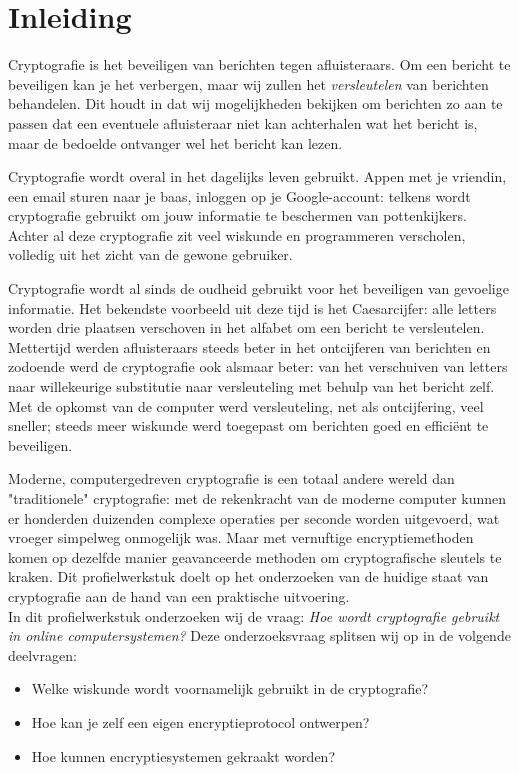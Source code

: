 \documentclass{report} %
\begin{document}
\chapter{Inleiding}
Cryptografie is het beveiligen van berichten tegen afluisteraars. Om een bericht te beveiligen kan je het verbergen, maar wij zullen het \textit{versleutelen} van berichten behandelen. Dit houdt in dat wij mogelijkheden bekijken om berichten zo aan te passen dat een eventuele afluisteraar niet kan achterhalen wat het bericht is, maar de bedoelde ontvanger wel het bericht kan lezen. 
\par Cryptografie wordt overal in het dagelijks leven gebruikt. Appen met je vriendin, een email sturen naar je baas, inloggen op je Google-account: telkens wordt cryptografie gebruikt om jouw informatie te beschermen van pottenkijkers. Achter al deze cryptografie zit veel wiskunde en programmeren verscholen, volledig uit het zicht van de gewone gebruiker. 
\par Cryptografie wordt al sinds de oudheid gebruikt voor het beveiligen van gevoelige informatie. Het bekendste voorbeeld uit deze tijd is het Caesarcijfer: alle letters worden drie plaatsen verschoven in het alfabet om een bericht te versleutelen. Mettertijd werden afluisteraars steeds beter in het ontcijferen van berichten en zodoende werd de cryptografie ook alsmaar beter: van het verschuiven van letters naar willekeurige substitutie naar versleuteling met behulp van het bericht zelf. Met de opkomst van de computer werd versleuteling, net als ontcijfering, veel sneller; steeds meer wiskunde werd toegepast om berichten goed en efficiënt te beveiligen.
\par Moderne, computergedreven cryptografie is een totaal andere wereld dan "traditionele" cryptografie: met de rekenkracht van de moderne computer kunnen er honderden duizenden complexe operaties per seconde worden uitgevoerd, wat vroeger simpelweg onmogelijk was. Maar met vernuftige encryptiemethoden komen op dezelfde manier geavanceerde methoden om cryptografische sleutels te kraken. Dit profielwerkstuk doelt op het onderzoeken van de huidige staat van cryptografie aan de hand van een praktische uitvoering.\\

In dit profielwerkstuk onderzoeken wij de vraag: \textit{Hoe wordt cryptografie gebruikt in online computersystemen?} Deze onderzoeksvraag splitsen wij op in de volgende deelvragen:
\begin{itemize}
    \item Welke wiskunde wordt voornamelijk gebruikt in de cryptografie?
    \item Hoe kan je zelf een eigen encryptieprotocol ontwerpen? %
    \item Hoe kunnen encryptiesystemen gekraakt worden?
\end{itemize}
\end{document}

